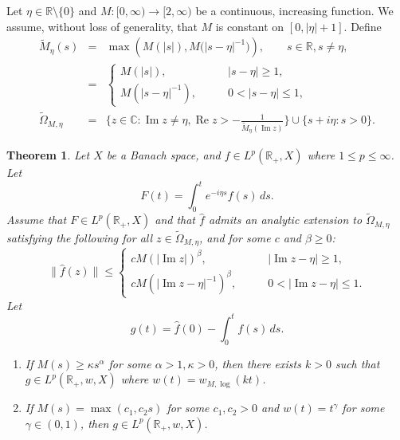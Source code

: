 \documentclass[11pt]{amsart}
\newtheorem{theorem}{Theorem}[section]
\theoremstyle{definition}
\theoremstyle{remark}
\numberwithin{equation}{section}
\begin{document}
Let $\eta \in {{\mathbb R}} \setminus \{0\}$ and $M: [0,\infty) \to [2,\infty)$ be a continuous, increasing function.  We assume, without loss of generality, that $M$ is constant on $[0,|\eta|+1]$. Define
\begin{eqnarray*}
\widetilde M_\eta(s) &=&  \max \left( M(|s|), M \big(|s-\eta|^{-1} \big) \right), \qquad s\in{{\mathbb R}}, s \ne \eta, \\
&=& \begin{cases} M(|s|), &\qquad |s-\eta|\ge 1, \\ M(|s-\eta|^{-1}), &\qquad 0<|s-\eta|\le1, \end{cases} \\
\widetilde \Omega_{M,\eta} &=& \Big\{z \in{{\mathbb C}} : {\operatorname{Im}} z \ne \eta, {\operatorname{Re}} z > - \frac {1}{\widetilde M_\eta({\operatorname{Im}} z)} \Big\} \cup \{s+i\eta : s>0\}.
\end{eqnarray*}

\begin{theorem} \label{lpsing}
Let $X$ be a Banach space, and $f \in L^p(\mathbb R_+, X)$ where $1 \le p \le \infty$.
Let
\[
F(t) = \int_0^t e^{-i \eta s} f(s) \, ds.
\]
 Assume that $F \in L^p({{\mathbb R}}_+,X)$ and that $\widehat f$ admits an analytic extension to $\widetilde\Omega_{M,\eta}$ satisfying the following for all $z\in \widetilde\Omega_{M,\eta}$, and for some $c$ and $\beta\ge0$:
\begin{equation} \label{omegasing}
\|\widehat f (z)\| \le
\begin{cases} c M(|{\operatorname{Im}} z|)^{\beta},  \qquad & |{\operatorname{Im}} z-\eta| \ge 1, \\ c M(|{\operatorname{Im}} z-\eta|^{-1})^{\beta}, \qquad & 0 < |{\operatorname{Im}} z-\eta| \le 1. \end{cases}
\end{equation}
Let
$$
g(t) =\widehat f(0) -\int_{0}^{t} f(s) \, ds.
$$
\begin{enumerate}[\rm(a)]
 \item \label{lpsinga} If $M(s) \ge \kappa s^\alpha$ for some $\alpha>1,\kappa>0$, then there exists $k>0$ such that $g \in L^p({{\mathbb R}}_+,w,X)$
where $w(t) = {w_{M,{\log}}}(kt)$.
\item \label{lpsingb}  If $M(s) = \max(c_1,c_2s)$ for some $c_1,c_2>0$ and $w(t) = t^\gamma$ for some $\gamma \in (0,1)$, then $g \in L^p({{\mathbb R}}_+,w,X)$.
\end{enumerate}
\end{theorem}
\end{document}
